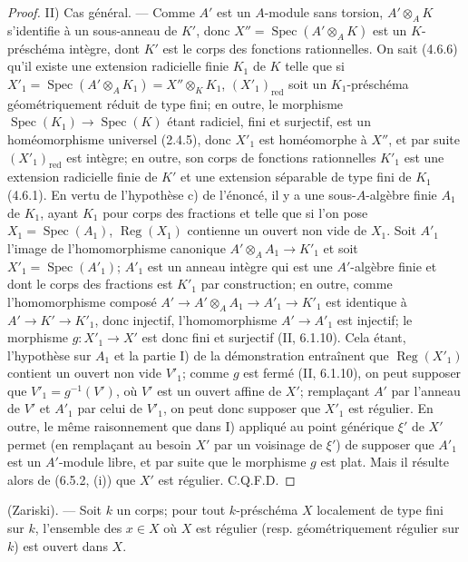 \begin{proof}
II) Cas général. --- Comme $A'$ est un $A$-module sans torsion,
$A'\otimes_AK$ s'identifie à un sous-anneau de $K'$, donc
$X''=\operatorname{Spec}(A'\otimes_AK)$ est un $K$-préschéma intègre, dont
$K'$ est le corps des fonctions rationnelles. On sait (4.6.6) qu'il existe
une extension radicielle finie $K_1$ de $K$ telle que si
$X'_1=\operatorname{Spec}(A'\otimes_AK_1)=X''\otimes_KK_1$,
$(X'_1)_{\mathrm{red}}$ soit un $K_1$-préschéma géométriquement réduit de
type fini; en outre, le morphisme $\operatorname{Spec}(K_1)\to
\operatorname{Spec}(K)$ étant radiciel, fini et surjectif, est un
homéomorphisme universel (2.4.5), donc $X'_1$ est homéomorphe à $X''$, et
par suite $(X'_1)_{\mathrm{red}}$ est intègre; en outre, son corps de
fonctions rationnelles $K'_1$ est une extension radicielle finie de $K'$ et
une extension séparable de type fini de $K_1$ (4.6.1). En vertu de
l'hypothèse c) de l'énoncé, il y a une sous-$A$-algèbre finie $A_1$ de
$K_1$, ayant $K_1$ pour corps des fractions et telle que si l'on pose
$X_1=\operatorname{Spec}(A_1)$, $\operatorname{Reg}(X_1)$ contienne un
ouvert non vide de $X_1$. Soit $A'_1$ l'image de l'homomorphisme canonique
$A'\otimes_AA_1\to K'_1$ et soit $X'_1=\operatorname{Spec}(A'_1)$; $A'_1$
est un anneau intègre qui est une $A'$-algèbre finie et dont le corps des
fractions est $K'_1$ par construction; en outre, comme l'homomorphisme
composé $A'\to A'\otimes_AA_1\to A'_1\to K'_1$ est identique à
$A'\to K'\to K'_1$, donc injectif, l'homomorphisme $A'\to A'_1$ est
injectif; le morphisme $g:X'_1\to X'$ est donc fini et surjectif
(II, 6.1.10). Cela étant, l'hypothèse sur $A_1$ et la partie I) de la
démonstration entraînent que $\operatorname{Reg}(X'_1)$
contient un ouvert non vide $V'_1$; comme $g$ est fermé (II, 6.1.10), on
peut supposer que $V'_1=g^{-1}(V')$, où $V'$ est un ouvert affine de $X'$;
remplaçant $A'$ par l'anneau de $V'$ et $A'_1$ par celui de $V'_1$, on peut
donc supposer que $X'_1$ est régulier. En outre, le même raisonnement que
dans I) appliqué au point générique $\xi'$ de $X'$ permet (en remplaçant au
besoin $X'$ par un voisinage de $\xi'$) de supposer que $A'_1$ est un
$A'$-module libre, et par suite que le morphisme $g$ est plat. Mais il
résulte alors de (6.5.2, (i)) que $X'$ est régulier. C.Q.F.D.
\end{proof}

\begin{corollary}[6.12.5]
\label{IV.2.s6.12.5-fr}
\textnormal{(Zariski).} --- Soit $k$ un corps; pour tout $k$-préschéma $X$
localement de type fini sur $k$, l'ensemble des $x\in X$ où $X$ est
régulier (resp. géométriquement régulier sur $k$) est ouvert dans $X$.
\end{corollary}

